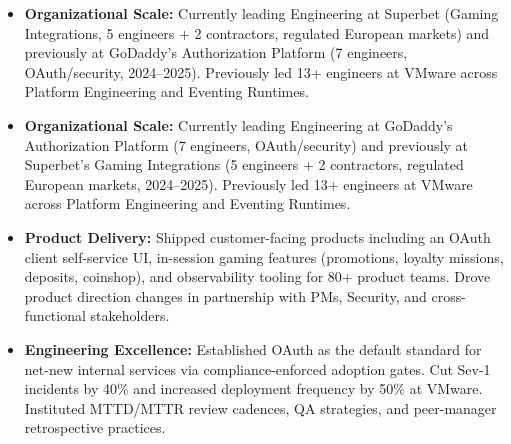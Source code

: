 \documentclass[10pt,a4paper,ragged2e,withhyper]{altacv}
\begin{document}
\setlength{\emergencystretch}{3em}


\begin{fullwidth}
\makecvheader
\end{fullwidth}
\vspace{-0.5em}
\small
\divider
\small
\begin{itemize}
    \ifdefined\EUVERSION
    \item \textbf{Organizational Scale:} Currently leading Engineering at Superbet (Gaming Integrations, 5 engineers + 2 contractors, regulated European markets) and previously at GoDaddy's Authorization Platform (7 engineers, OAuth/security, 2024--2025). Previously led 13+ engineers at VMware across Platform Engineering and Eventing Runtimes.
    \else
    \item \textbf{Organizational Scale:} Currently leading Engineering at GoDaddy's Authorization Platform (7 engineers, OAuth/security) and previously at Superbet's Gaming Integrations (5 engineers + 2 contractors, regulated European markets, 2024--2025). Previously led 13+ engineers at VMware across Platform Engineering and Eventing Runtimes.
    \fi
    \item \textbf{Product Delivery:} Shipped customer-facing products including an OAuth client self-service UI, in-session gaming features (promotions, loyalty missions, deposits, coinshop), and observability tooling for 80+ product teams. Drove product direction changes in partnership with PMs, Security, and cross-functional stakeholders.
    \item \textbf{Engineering Excellence:} Established OAuth as the default standard for net-new internal services via compliance-enforced adoption gates. Cut Sev-1 incidents by 40\% and increased deployment frequency by 50\% at VMware. Instituted MTTD/MTTR review cadences, QA strategies, and peer-manager retrospective practices.
\end{itemize}

\vspace{1em}


\ifdefined\EUVERSION
\end{document}
